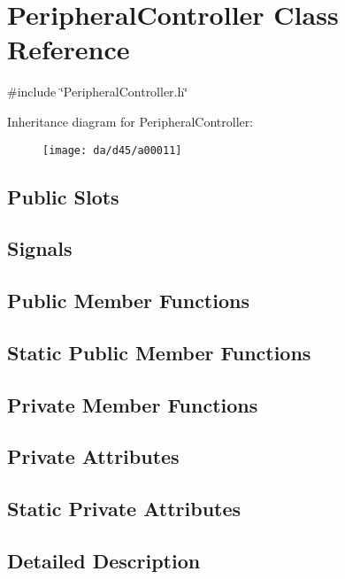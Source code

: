 \hypertarget{a00011}{\section{Peripheral\-Controller Class Reference}
\label{a00011}
}


{\ttfamily \#include \char`\"{}Peripheral\-Controller.\-h\char`\"{}}

Inheritance diagram for Peripheral\-Controller\-:\begin{figure}[H]
\begin{center}
\leavevmode
\texttt{[image: da/d45/a00011]}
\end{center}
\end{figure}
\subsection*{Public Slots}
\subsection*{Signals}
\subsection*{Public Member Functions}
\subsection*{Static Public Member Functions}
\subsection*{Private Member Functions}
\subsection*{Private Attributes}
\subsection*{Static Private Attributes}


\subsection{Detailed Description}


